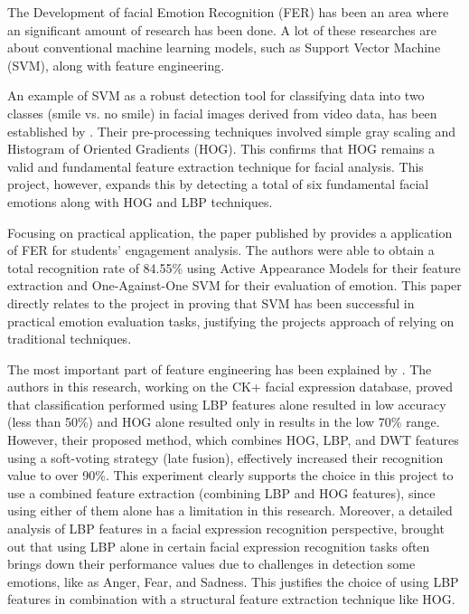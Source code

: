 The Development of facial Emotion Recognition (FER) has been an area where an significant amount of research has been done. A lot of these researches are about conventional machine learning models, such as Support Vector Machine (SVM), along with feature engineering.

An example of SVM as a robust detection tool for classifying data into two classes (smile vs. no smile) in facial images derived from video data, has been established by \citep{Abdul-Hadi2020}. Their pre-processing techniques involved simple gray scaling and Histogram of Oriented Gradients (HOG). This confirms that HOG remains a valid and fundamental feature extraction technique for facial analysis. This project, however, expands this by detecting a total of six fundamental facial emotions along with HOG and LBP techniques.

Focusing on practical application, the paper published by \citep{Sun2008} provides a application of FER for students' engagement analysis. The authors were able to obtain a total recognition rate of 84.55\% using Active Appearance Models for their feature extraction and One-Against-One SVM for their evaluation of emotion. This paper directly relates to the project in proving that SVM has been successful in practical emotion evaluation tasks, justifying the projects approach of relying on traditional techniques.

The most important part of feature engineering has been explained by \citep{Sastriana2024}. The authors in this research, working on the CK+ facial expression database, proved that classification performed using LBP features alone resulted in low accuracy (less than 50\%) and HOG alone resulted only in results in the low 70\% range. However, their proposed method, which combines HOG, LBP, and DWT features using a soft-voting strategy (late fusion), effectively increased their recognition value to over 90\%. This experiment clearly supports the choice in this project to use a combined feature extraction (combining LBP and HOG features), since using either of them alone has a limitation in this research. Moreover, a detailed analysis of LBP features in a facial expression recognition perspective, \citep{Shan2009} brought out that using LBP alone in certain facial expression recognition tasks often brings down their performance values due to challenges in detection some emotions, like as Anger, Fear, and Sadness. This justifies the choice of using LBP features in combination with a structural feature extraction technique like HOG.

